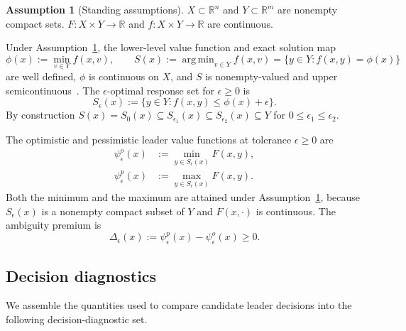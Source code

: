 \documentclass[11pt]{article}
\theoremstyle{definition}
\newtheorem{assumption}[theorem]{Assumption}
\newcommand{\R}{\mathbb{R}}
\newcommand{\eps}{\epsilon}
\DeclareMathOperator*{\argmin}{arg\,min}
\begin{document}
\begin{assumption}[Standing assumptions]\label{ass:standing}
$X\subset\R^n$ and $Y\subset\R^m$ are nonempty compact sets.
$F:X\times Y\to\R$ and $f:X\times Y\to\R$ are continuous.
\end{assumption}

\noindent
Under Assumption~\ref{ass:standing}, the lower-level value function
and exact solution map
\begin{equation}\label{eq:phi-S}
  \phi(x):=\min_{v\in Y} f(x,v),
  \qquad
  S(x):=\argmin_{v\in Y} f(x,v)=\{y\in Y:f(x,y)=\phi(x)\}
\end{equation}
are well defined, $\phi$ is continuous on $X$, and $S$ is
nonempty-valued and upper semicontinuous~\cite{bonnans2013perturbation}. The
$\eps$-optimal response set for $\eps\ge 0$ is
\begin{equation}\label{eq:Seps}
  S_\eps(x):=\{y\in Y : f(x,y)\le \phi(x)+\eps\}.
\end{equation}
By construction
$S(x)=S_0(x)\subseteq S_{\eps_1}(x)\subseteq S_{\eps_2}(x)\subseteq Y$
for $0\le\eps_1\le\eps_2$.

The optimistic and pessimistic leader value functions at tolerance
$\eps\ge 0$ are
\begin{align}
  \psi_\eps^o(x)
  &:=\min_{y\in S_\eps(x)} F(x,y),
  \label{eq:psi-o}\\
  \psi_\eps^p(x)
  &:=\max_{y\in S_\eps(x)} F(x,y).
  \label{eq:psi-p}
\end{align}
Both the minimum and the maximum are attained under
Assumption~\ref{ass:standing}, because $S_\eps(x)$ is a nonempty
compact subset of $Y$ and $F(x,\cdot)$ is continuous. The
ambiguity premium is
\begin{equation}\label{eq:premium-def}
  \Delta_\eps(x):=\psi_\eps^p(x)-\psi_\eps^o(x)\ge 0.
\end{equation}

\subsection{Decision diagnostics}
\label{sec:diagnostics}
We assemble the quantities used to compare candidate leader
decisions into the following decision-diagnostic set. 
\end{document}
